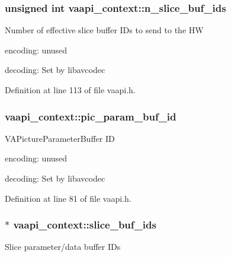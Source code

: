 \subsubsection[{\texorpdfstring{n\+\_\+slice\+\_\+buf\+\_\+ids}{n_slice_buf_ids}}]{\setlength{\rightskip}{0pt plus 5cm}unsigned {\bf int} vaapi\+\_\+context\+::n\+\_\+slice\+\_\+buf\+\_\+ids}\hypertarget{structvaapi__context_aee70c2c0dab6a499d2692e46fc0c0cca}{}\label{structvaapi__context_aee70c2c0dab6a499d2692e46fc0c0cca}
Number of effective slice buffer I\+Ds to send to the HW


\begin{DoxyItemize}
\item encoding\+: unused
\item decoding\+: Set by libavcodec 
\end{DoxyItemize}

Definition at line 113 of file vaapi.\+h.

\subsubsection[{\texorpdfstring{pic\+\_\+param\+\_\+buf\+\_\+id}{pic_param_buf_id}}]{ vaapi\+\_\+context\+::pic\+\_\+param\+\_\+buf\+\_\+id}\hypertarget{structvaapi__context_ad674d4caefd1f4a1de37e5c05e595194}{}\label{structvaapi__context_ad674d4caefd1f4a1de37e5c05e595194}
V\+A\+Picture\+Parameter\+Buffer ID


\begin{DoxyItemize}
\item encoding\+: unused
\item decoding\+: Set by libavcodec 
\end{DoxyItemize}

Definition at line 81 of file vaapi.\+h.

\subsubsection[{\texorpdfstring{slice\+\_\+buf\+\_\+ids}{slice_buf_ids}}]{$\ast$ vaapi\+\_\+context\+::slice\+\_\+buf\+\_\+ids}\hypertarget{structvaapi__context_adc452028b6218a76c8ec270f8311b15f}{}\label{structvaapi__context_adc452028b6218a76c8ec270f8311b15f}
Slice parameter/data buffer I\+Ds


